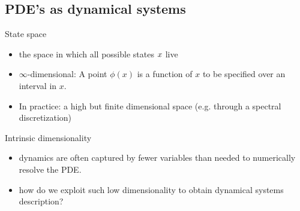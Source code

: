 \documentclass{beamer}
\begin{document}
\subsection{PDE's as dynamical systems}

\begin{frame}

\begin{block}{State space}
 \begin{itemize}
	\item the space in which all possible states $x$ live
	\item $\infty$-dimensional: A point $\phi(x)$ is a function of $x$ to be specified
		over an interval in $x$.
	\item In practice: a high but finite dimensional space
     (e.g. through a spectral discretization)
 \end{itemize}
\end{block}

\begin{block}{Intrinsic dimensionality}
 \begin{itemize}
  \item dynamics are often captured by fewer variables than
        needed to numerically resolve the PDE.
  \item how do we exploit such low dimensionality to obtain
  dynamical systems description?
 \end{itemize}
\end{block}

\end{frame}
\end{document}
